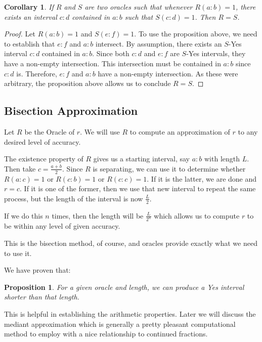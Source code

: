 \documentclass[12pt]{article}
\newtheorem{corollary}{Corollary}
\newtheorem{proposition}{Proposition}
\theoremstyle{remark}
\begin{document}
\begin{corollary}
    If $R$ and $S$ are two oracles such that whenever $R(a:b) = 1$, there exists an interval $c:d$ contained in $a:b$ such that $S(c:d) = 1$. Then $R=S$.
\end{corollary}

\begin{proof}
Let $R(a:b)=1$ and $S(e:f) = 1$. To use the proposition above, we need to establish that $e:f$ and $a:b$ intersect. By assumption, there exists an $S$-Yes interval $c:d$ contained in $a:b$. Since both $c:d$ and $e:f$ are $S$-Yes intervals, they have a non-empty intersection. This intersection must be contained in $a:b$ since $c:d$ is. Therefore, $e:f$ and $a:b$ have a non-empty intersection. As these were arbitrary, the proposition above allows us to conclude $R=S$.
\end{proof}


\subsection{Bisection Approximation}

Let $R$ be the Oracle of $r$. We will use $R$ to compute an approximation of $r$ to any desired level of accuracy. 

The existence property of $R$ gives us a starting interval, say $a:b$ with length $L$. Then take $c = \frac{a+b}{2}$. Since $R$ is separating, we can use it to determine whether $R(a:c) = 1$ or $R(c:b) = 1$ or $R(c:c) = 1$. If it is the latter, we are done and $r = c$. If it is one of the former, then we use that new interval to repeat the same process, but the length of the interval is now $\frac{L}{2}$. 

If we do this $n$ times, then the length will be $\frac{L}{2^n}$ which allows us to compute $r$ to be within any level of given accuracy. 

This is the bisection method, of course, and oracles provide exactly what we need to use it. 

We have proven that: 

\begin{proposition}\label{pr:short}
For a given oracle and length, we can produce a Yes interval shorter than that length. 
\end{proposition}

This is helpful in establishing the arithmetic properties. Later we will discuss the mediant approximation which is generally a pretty pleasant computational method to employ with a nice relationship to continued fractions. 
\end{document}
